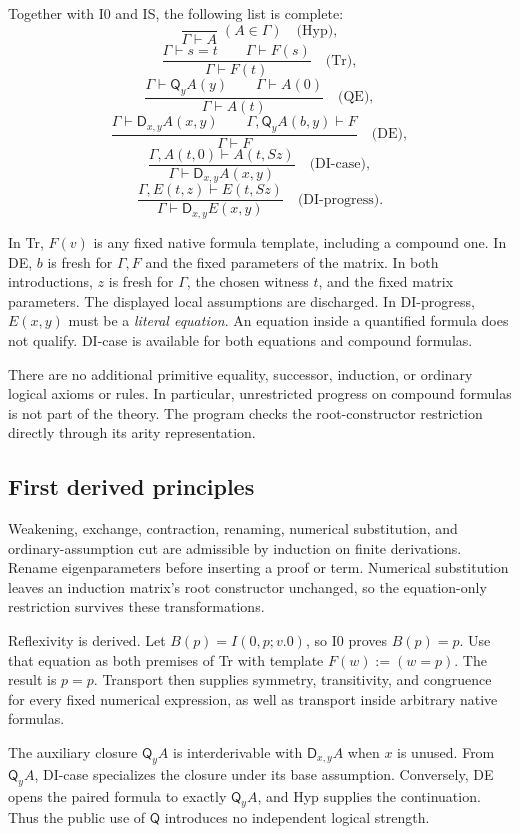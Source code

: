 \documentclass[11pt,letterpaper]{article}
\theoremstyle{definition}\newtheorem{definition}[theorem]{Definition}
\theoremstyle{remark}\newtheorem{remark}[theorem]{Remark}
\newcommand{\D}{\mathsf D}
\newcommand{\Q}{\mathsf Q}
\begin{document}
Together with I0 and IS, the following list is complete:
\[
 \frac{}{\Gamma\vdash A}\;(A\in\Gamma)
 \quad\text{(Hyp)},
\]
\[
 \frac{\Gamma\vdash s=t\qquad\Gamma\vdash F(s)}
      {\Gamma\vdash F(t)}
 \quad\text{(Tr)},
\]
\[
 \frac{\Gamma\vdash\Q_yA(y)\qquad\Gamma\vdash A(0)}
      {\Gamma\vdash A(t)}
 \quad\text{(QE)},
\]
\[
 \frac{\Gamma\vdash\D_{x,y}A(x,y)\qquad
       \Gamma,\Q_yA(b,y)\vdash F}
      {\Gamma\vdash F}
 \quad\text{(DE)},
\]
\[
 \frac{\Gamma,A(t,0)\vdash A(t,Sz)}
      {\Gamma\vdash\D_{x,y}A(x,y)}
 \quad\text{(DI-case)},
\]
\[
 \frac{\Gamma,E(t,z)\vdash E(t,Sz)}
      {\Gamma\vdash\D_{x,y}E(x,y)}
 \quad\text{(DI-progress)}.
\]

In Tr, $F(v)$ is any fixed native formula template, including a
compound one. In DE, $b$ is fresh for $\Gamma,F$ and the fixed
parameters of the matrix. In both introductions, $z$ is fresh for
$\Gamma$, the chosen witness $t$, and the fixed matrix parameters.
The displayed local assumptions are discharged. In DI-progress,
$E(x,y)$ must be a \emph{literal equation}. An equation inside a
quantified formula does not qualify. DI-case is available for both
equations and compound formulas.

There are no additional primitive equality, successor, induction, or
ordinary logical axioms or rules. In particular, unrestricted progress
on compound formulas is not part of the theory. The program checks the
root-constructor restriction directly through its arity representation.

\subsection{First derived principles}

Weakening, exchange, contraction, renaming, numerical substitution,
and ordinary-assumption cut are admissible by induction on finite
derivations. Rename eigenparameters before inserting a proof or term.
Numerical substitution leaves an induction matrix's root constructor
unchanged, so the equation-only restriction survives these transformations.

Reflexivity is derived. Let $B(p)=I(0,p;v.0)$, so I0 proves $B(p)=p$.
Use that equation as both premises of Tr with template $F(w):=(w=p)$.
The result is $p=p$. Transport then supplies symmetry, transitivity,
and congruence for every fixed numerical expression, as well as transport
inside arbitrary native formulas.

The auxiliary closure $\Q_y A$ is interderivable with
$\D_{x,y}A$ when $x$ is unused. From $\Q_y A$, DI-case specializes
the closure under its base assumption. Conversely, DE opens the paired
formula to exactly $\Q_y A$, and Hyp supplies the continuation. Thus
the public use of $\Q$ introduces no independent logical strength.
\end{document}
